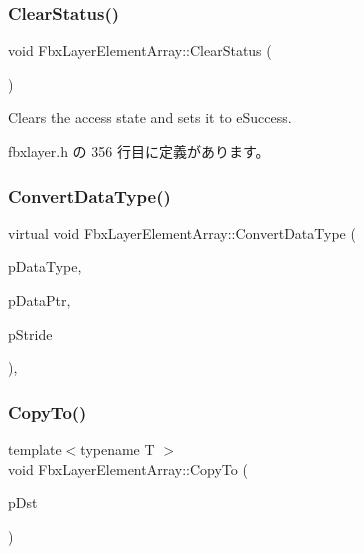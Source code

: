\subsubsection{\texorpdfstring{Clear\+Status()}{ClearStatus()}}
{\footnotesize\ttfamily void Fbx\+Layer\+Element\+Array\+::\+Clear\+Status (\begin{DoxyParamCaption}{ }\end{DoxyParamCaption})\hspace{0.3cm}{\ttfamily [inline]}}



Clears the access state and sets it to e\+Success. 



 fbxlayer.\+h の 356 行目に定義があります。

\mbox{\label{class_fbx_layer_element_array_a48cc30130ebd4a38d910547d2f7282c0}} 
\subsubsection{\texorpdfstring{Convert\+Data\+Type()}{ConvertDataType()}}
{\footnotesize\ttfamily virtual void Fbx\+Layer\+Element\+Array\+::\+Convert\+Data\+Type (\begin{DoxyParamCaption}\item[{\hyperlink{fbxpropertytypes_8h_a73913a5ddfb20e57c6f25e9e6784bd92}{E\+Fbx\+Type}}]{p\+Data\+Type,  }\item[{void $\ast$$\ast$}]{p\+Data\+Ptr,  }\item[{size\+\_\+t $\ast$}]{p\+Stride }\end{DoxyParamCaption})\hspace{0.3cm}{\ttfamily [protected]}, {\ttfamily [virtual]}}

\mbox{\label{class_fbx_layer_element_array_a64ddf869251ef992f995a5bb9c16efcc}} 
\subsubsection{\texorpdfstring{Copy\+To()}{CopyTo()}}
{\footnotesize\ttfamily template$<$typename T $>$ \\
void Fbx\+Layer\+Element\+Array\+::\+Copy\+To (\begin{DoxyParamCaption}\item[{\hyperlink{class_fbx_array}{Fbx\+Array}$<$ T $>$ \&}]{p\+Dst }\end{DoxyParamCaption})\hspace{0.3cm}{\ttfamily [inline]}}

